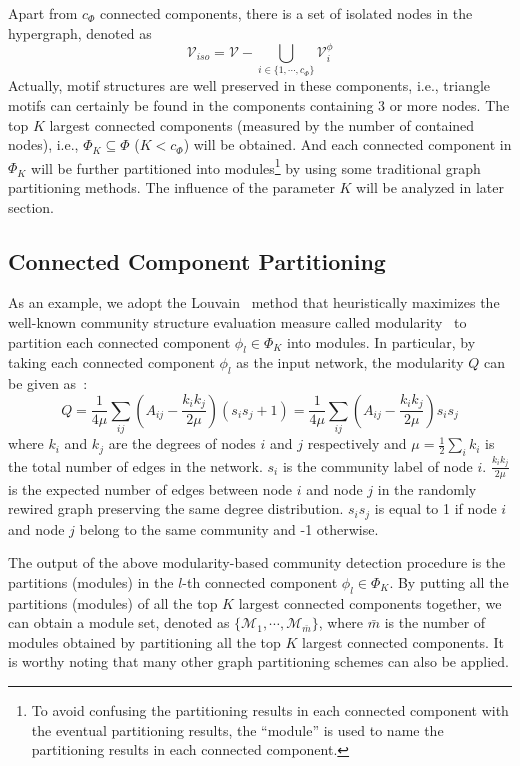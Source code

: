 \documentclass[sigconf]{acmart}
\begin{document}
Apart from $c_{\Phi}$ connected components, there is a set of isolated nodes in the hypergraph, denoted as
\begin{equation}
\label{eq:Viso}
\mathcal{V}_{iso} = \mathcal{V} - \bigcup_{i \in \{1, \cdots, c_{\Phi}\}} \mathcal{V}^{\phi}_{i}
\end{equation}
Actually, motif structures are well preserved in these components, i.e., triangle motifs can certainly be found in the components containing 3 or more nodes.
The top $K$ largest connected components (measured by the number of contained nodes), i.e.,
$ \Phi_{K} \subseteq \Phi$ ($K<c_{\Phi}$) will be obtained. And each connected component in $\Phi_{K}$ will be further partitioned into modules\footnote{To avoid confusing the partitioning results in each connected component with the eventual partitioning results, the ``module'' is used to name the partitioning results in each connected component.} by using some traditional graph partitioning methods.
The influence of the parameter $K$ will be analyzed in later section.

\subsection{Connected Component Partitioning}
As an example, we adopt the Louvain~\cite{Vincent2008Fast} method that heuristically maximizes the well-known community structure evaluation measure called modularity~\cite{newman2006modularity,newman2004finding} to partition each connected component $\phi_{l}\in\Phi_{K}$ into modules. In particular, by taking each connected component $\phi_{l}$ as the input network, the modularity $Q$ can be given as~\cite{newman2006modularity}:
\begin{equation}
\label{eq:modularity}
Q = \frac{1}{4\mu}\sum_{ij}(A_{ij}-\frac{k_{i}k_{j}}{2\mu})(s_{i}s_{j}+1) = \frac{1}{4\mu}\sum_{ij}(A_{ij}-\frac{k_{i}k_{j}}{2\mu})s_{i}s_{j}
\end{equation}
where $k_{i}$ and $k_{j}$ are the degrees of nodes $i$ and $j$ respectively and $\mu = \frac{1}{2}\sum_{i}k_{i}$ is the total number of edges in the network. $s_{i}$ is the community label of node $i$. $\frac{k_{i}k_{j}}{2\mu}$ is the expected number of edges between node $i$ and node $j$ in the randomly rewired graph preserving the same degree distribution. $s_{i}s_{j}$ is equal to 1 if node $i$ and node $j$ belong to the same community and -1 otherwise. 



The output of the above modularity-based community detection procedure is the partitions (modules) in the $l$-th connected component $\phi_{l}\in\Phi_{K}$. By putting all the partitions (modules) of all the top $K$ largest connected components together, we can obtain a module set, denoted as $\{\mathcal{M}_{1},\cdots, \mathcal{M}_{\bar{m}}\}$, where $\bar{m}$ is the number of modules obtained by partitioning all the top $K$ largest connected components.
It is worthy noting that many other graph partitioning schemes can also be applied. 
\end{document}
